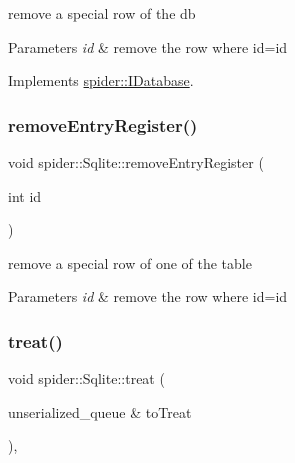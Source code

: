 remove a special row of the db 


\begin{DoxyParams}{Parameters}
{\em id} & remove the row where id=id \\
\hline
\end{DoxyParams}


Implements \hyperlink{classspider_1_1_i_database_a88a6faa9ca865e687de6f62ddb131915}{spider\+::\+I\+Database}.

\mbox{\label{classspider_1_1_sqlite_a3e869993d86dc5501fe66cc5d2b05c04}} 
\subsubsection{\texorpdfstring{remove\+Entry\+Register()}{removeEntryRegister()}}
{\footnotesize\ttfamily void spider\+::\+Sqlite\+::remove\+Entry\+Register (\begin{DoxyParamCaption}\item[{int}]{id }\end{DoxyParamCaption})}



remove a special row of one of the table 


\begin{DoxyParams}{Parameters}
{\em id} & remove the row where id=id \\
\hline
\end{DoxyParams}
\mbox{\label{classspider_1_1_sqlite_a3f2bc8e3e6eae99b7e2d4e9d9f6e0e94}} 
\subsubsection{\texorpdfstring{treat()}{treat()}}
{\footnotesize\ttfamily void spider\+::\+Sqlite\+::treat (\begin{DoxyParamCaption}\item[{unserialized\+\_\+queue \&}]{to\+Treat }\end{DoxyParamCaption})\hspace{0.3cm}{\ttfamily [override]}, {\ttfamily [virtual]}}



